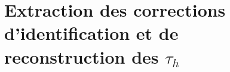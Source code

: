 \chapter{Extraction des corrections d'identification et de reconstruction des $\tau_h$}
\label{annexB}